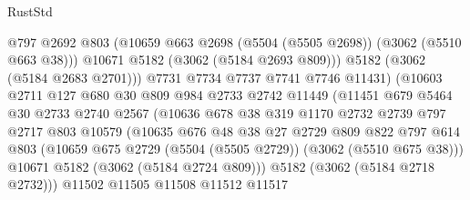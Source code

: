 \begin{lexlean}{RustStd}
\begin{coremodule}
                                @797
                                @2692
                                @803
                                (@10659 @663 @2698 (@5504 (@5505 @2698)) (@3062 (@5510 @663 @38)))
                                @10671
                                @5182
                                (@3062 (@5184 @2693 @809)))
                              @5182
                              (@3062 (@5184 @2683 @2701)))
                            @7731
                            @7734
                            @7737
                            @7741
                            @7746
                            @11431)
                          (@10603
                            @2711
                            @127
                            @680
                            @30
                            @809
                            @984
                            @2733
                            @2742
                            @11449
                            (@11451
                              @679
                              @5464
                              @30
                              @2733
                              @2740
                              @2567
                              (@10636
                                @678
                                @38
                                @319
                                @1170
                                @2732
                                @2739
                                @797
                                @2717
                                @803
                                @10579
                                (@10635
                                  @676
                                  @48
                                  @38
                                  @27
                                  @2729
                                  @809
                                  @822
                                  @797
                                  @614
                                  @803
                                  (@10659 @675 @2729 (@5504 (@5505 @2729)) (@3062 (@5510 @675 @38)))
                                  @10671
                                  @5182
                                  (@3062 (@5184 @2724 @809)))
                                @5182
                                (@3062 (@5184 @2718 @2732)))
                              @11502
                              @11505
                              @11508
                              @11512
                              @11517

\end{coremodule}
\end{lexlean}

